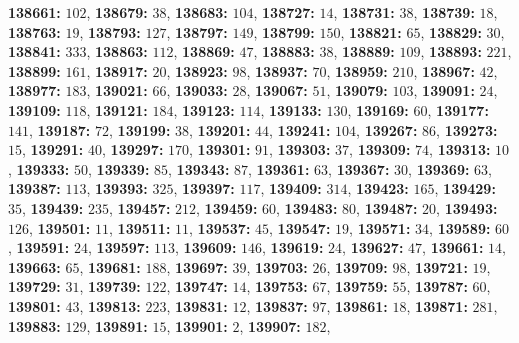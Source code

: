 \textsf{\bfseries 138661:} $102$, \textsf{\bfseries 138679:} $38$, \textsf{\bfseries 138683:} $104$, \textsf{\bfseries 138727:} $14$, \textsf{\bfseries 138731:} $38$, \textsf{\bfseries 138739:} $18$, \textsf{\bfseries 138763:} $19$, \textsf{\bfseries 138793:} $127$, \textsf{\bfseries 138797:} $149$, \textsf{\bfseries 138799:} $150$, \textsf{\bfseries 138821:} $65$, \textsf{\bfseries 138829:} $30$, \textsf{\bfseries 138841:} $333$, \textsf{\bfseries 138863:} $112$, \textsf{\bfseries 138869:} $47$, \textsf{\bfseries 138883:} $38$, \textsf{\bfseries 138889:} $109$, \textsf{\bfseries 138893:} $221$, \textsf{\bfseries 138899:} $161$, \textsf{\bfseries 138917:} $20$, \textsf{\bfseries 138923:} $98$, \textsf{\bfseries 138937:} $70$, \textsf{\bfseries 138959:} $210$, \textsf{\bfseries 138967:} $42$, \textsf{\bfseries 138977:} $183$, \textsf{\bfseries 139021:} $66$, \textsf{\bfseries 139033:} $28$, \textsf{\bfseries 139067:} $51$, \textsf{\bfseries 139079:} $103$, \textsf{\bfseries 139091:} $24$, \textsf{\bfseries 139109:} $118$, \textsf{\bfseries 139121:} $184$, \textsf{\bfseries 139123:} $114$, \textsf{\bfseries 139133:} $130$, \textsf{\bfseries 139169:} $60$, \textsf{\bfseries 139177:} $141$, \textsf{\bfseries 139187:} $72$, \textsf{\bfseries 139199:} $38$, \textsf{\bfseries 139201:} $44$, \textsf{\bfseries 139241:} $104$, \textsf{\bfseries 139267:} $86$, \textsf{\bfseries 139273:} $15$, \textsf{\bfseries 139291:} $40$, \textsf{\bfseries 139297:} $170$, \textsf{\bfseries 139301:} $91$, \textsf{\bfseries 139303:} $37$, \textsf{\bfseries 139309:} $74$, \textsf{\bfseries 139313:} $10$, \textsf{\bfseries 139333:} $50$, \textsf{\bfseries 139339:} $85$, \textsf{\bfseries 139343:} $87$, \textsf{\bfseries 139361:} $63$, \textsf{\bfseries 139367:} $30$, \textsf{\bfseries 139369:} $63$, \textsf{\bfseries 139387:} $113$, \textsf{\bfseries 139393:} $325$, \textsf{\bfseries 139397:} $117$, \textsf{\bfseries 139409:} $314$, \textsf{\bfseries 139423:} $165$, \textsf{\bfseries 139429:} $35$, \textsf{\bfseries 139439:} $235$, \textsf{\bfseries 139457:} $212$, \textsf{\bfseries 139459:} $60$, \textsf{\bfseries 139483:} $80$, \textsf{\bfseries 139487:} $20$, \textsf{\bfseries 139493:} $126$, \textsf{\bfseries 139501:} $11$, \textsf{\bfseries 139511:} $11$, \textsf{\bfseries 139537:} $45$, \textsf{\bfseries 139547:} $19$, \textsf{\bfseries 139571:} $34$, \textsf{\bfseries 139589:} $60$, \textsf{\bfseries 139591:} $24$, \textsf{\bfseries 139597:} $113$, \textsf{\bfseries 139609:} $146$, \textsf{\bfseries 139619:} $24$, \textsf{\bfseries 139627:} $47$, \textsf{\bfseries 139661:} $14$, \textsf{\bfseries 139663:} $65$, \textsf{\bfseries 139681:} $188$, \textsf{\bfseries 139697:} $39$, \textsf{\bfseries 139703:} $26$, \textsf{\bfseries 139709:} $98$, \textsf{\bfseries 139721:} $19$, \textsf{\bfseries 139729:} $31$, \textsf{\bfseries 139739:} $122$, \textsf{\bfseries 139747:} $14$, \textsf{\bfseries 139753:} $67$, \textsf{\bfseries 139759:} $55$, \textsf{\bfseries 139787:} $60$, \textsf{\bfseries 139801:} $43$, \textsf{\bfseries 139813:} $223$, \textsf{\bfseries 139831:} $12$, \textsf{\bfseries 139837:} $97$, \textsf{\bfseries 139861:} $18$, \textsf{\bfseries 139871:} $281$, \textsf{\bfseries 139883:} $129$, \textsf{\bfseries 139891:} $15$, \textsf{\bfseries 139901:} $2$, \textsf{\bfseries 139907:} $182$, 
